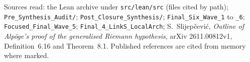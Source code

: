 \documentclass[11pt]{article}
\newcommand{\Lpath}[1]{\nolinkurl{#1}}
\theoremstyle{remark}
\begin{document}
\bigskip\noindent\small Sources read: the Lean archive under \Lpath{src/lean/src} (files cited by path); \Lpath{Pre_Synthesis_Audit/}; \Lpath{Post_Closure_Synthesis/}; \Lpath{Final_Six_Wave_1} to \Lpath{_6}; \Lpath{Focused_Final_Wave_5}; \Lpath{Final_4_LinkS_LocalArch}; S.~Slijepčević, \emph{Outline of Alpöge's proof of the generalised Riemann hypothesis}, arXiv 2611.00812v1, Definition~6.16 and Theorem~8.1. Published references are cited from memory where marked.
\end{document}
